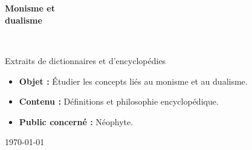 \begin{titlepage}
%
~\\[1cm]

\begin{center}
\end{center}

\textsc{\Large }\\[0.5cm]

\HRule

\begin{center}
{\huge \bfseries  Monisme et\\
dualisme\\[0.4cm] }
\end{center}

\HRule \\[1.5cm]


\vfill

\hfill
\begin{minipage}{0.4\textwidth}
\begin{flushright} \large
Extraits de dictionnaires et d'encyclopédies
\end{flushright}
\end{minipage}

\vfill
{\sf \footnotesize
\begin{itemize}[leftmargin=1cm, label=, itemsep=1pt]
\item {\bf Objet : } Étudier les concepts liés au monisme et au dualisme.
\item {\bf Contenu : } Définitions et philosophie encyclopédique.
\item {\bf Public concerné : } Néophyte.
\end{itemize}
}

\vfill

{\large \today}

\end{titlepage}
